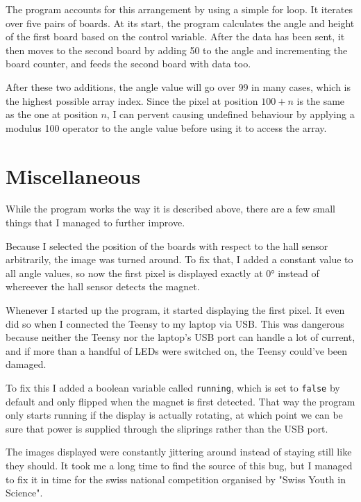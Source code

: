\documentclass[a4paper, 11pt, titlepage]{report}
\begin{document}
The program accounts for this arrangement by using a simple for loop. It iterates over five pairs
of boards. At its start, the program calculates the angle and height of the first board based on
the control variable. After the data has been sent, it then moves to the second board by adding 50
to the angle and incrementing the board counter, and feeds the second board with data too.

After these two additions, the angle value will go over 99 in many cases, which is the highest
possible array index. Since the pixel at position $100+n$ is the same as the one at position $n$, I
can pervent causing undefined behaviour by applying a modulus 100 operator to the angle value
before using it to access the array.


\section{Miscellaneous}

While the program works the way it is described above, there are a few small things that I managed
to further improve.

Because I selected the position of the boards with respect to the hall sensor arbitrarily, the
image was turned around. To fix that, I added a constant value to all angle values, so now the
first pixel is displayed exactly at 0° instead of whereever the hall sensor detects the magnet.

Whenever I started up the program, it started displaying the first pixel. It even did so when I
connected the Teensy to my laptop via USB. This was dangerous because neither the Teensy nor the
laptop's USB port can handle a lot of current, and if more than a handful of LEDs were switched on,
the Teensy could've been damaged.

To fix this I added a boolean variable called \texttt{running}, which is set to \texttt{false} by
default and only flipped when the magnet is first detected. That way the program only starts
running if the display is actually rotating, at which point we can be sure that power is supplied
through the sliprings rather than the USB port.

The images displayed were constantly jittering around instead of staying still like they should. It
took me a long time to find the source of this bug, but I managed to fix it in time for the swiss
national competition organised by "Swiss Youth in Science".
\end{document}
